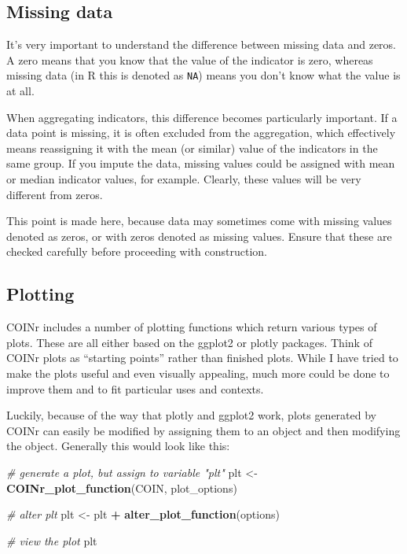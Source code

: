\documentclass[
]{book}
\newenvironment{Shaded}{\begin{snugshade}}{\end{snugshade}}
\newcommand{\CommentTok}[1]{\textcolor[rgb]{0.56,0.35,0.01}{\textit{#1}}}
\newcommand{\KeywordTok}[1]{\textcolor[rgb]{0.13,0.29,0.53}{\textbf{#1}}}
\newcommand{\NormalTok}[1]{#1}
\newcommand{\OperatorTok}[1]{\textcolor[rgb]{0.81,0.36,0.00}{\textbf{#1}}}
\newcommand{\StringTok}[1]{\textcolor[rgb]{0.31,0.60,0.02}{#1}}
\begin{document}
\hypertarget{missing-data}{%
\subsection{Missing data}\label{missing-data}}

It's very important to understand the difference between missing data and zeros. A zero means that you know that the value of the indicator is zero, whereas missing data (in R this is denoted as \texttt{NA}) means you don't know what the value is at all.

When aggregating indicators, this difference becomes particularly important. If a data point is missing, it is often excluded from the aggregation, which effectively means reassigning it with the mean (or similar) value of the indicators in the same group. If you impute the data, missing values could be assigned with mean or median indicator values, for example. Clearly, these values will be very different from zeros.

This point is made here, because data may sometimes come with missing values denoted as zeros, or with zeros denoted as missing values. Ensure that these are checked carefully before proceeding with construction.

\hypertarget{plotting}{%
\subsection{Plotting}\label{plotting}}

COINr includes a number of plotting functions which return various types of plots. These are all either based on the ggplot2 or plotly packages. Think of COINr plots as ``starting points'' rather than finished plots. While I have tried to make the plots useful and even visually appealing, much more could be done to improve them and to fit particular uses and contexts.

Luckily, because of the way that plotly and ggplot2 work, plots generated by COINr can easily be modified by assigning them to an object and then modifying the object. Generally this would look like this:

\begin{Shaded}
\begin{Highlighting}[]
\CommentTok{# generate a plot, but assign to variable "plt"}
\NormalTok{plt <-}\StringTok{ }\KeywordTok{COINr_plot_function}\NormalTok{(COIN, plot_options)}

\CommentTok{# alter plt}
\NormalTok{plt <-}\StringTok{ }\NormalTok{plt }\OperatorTok{+}\StringTok{ }\KeywordTok{alter_plot_function}\NormalTok{(options)}

\CommentTok{# view the plot}
\NormalTok{plt}
\end{Highlighting}
\end{Shaded}
\end{document}
